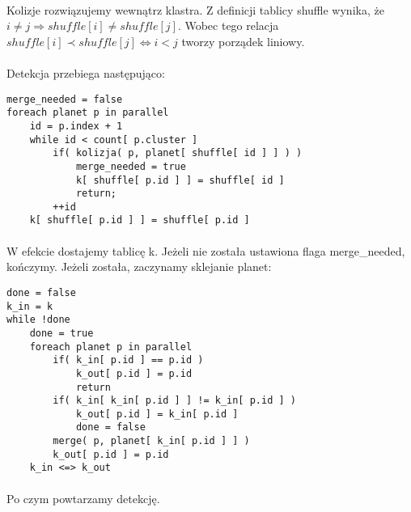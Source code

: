 \paragraph{} Kolizje rozwiązujemy wewnątrz klastra.  Z definicji tablicy shuffle wynika, że \ensuremath{i \neq j \Rightarrow shuffle[i]\neq shuffle[j]}. Wobec tego relacja \ensuremath{shuffle[i] \prec shuffle[j] \Leftrightarrow i<j } tworzy porządek liniowy.

\paragraph{} Detekcja przebiega następująco:
\begin{lstlisting}
merge_needed = false
foreach planet p in parallel
	id = p.index + 1
	while id < count[ p.cluster ]
		if( kolizja( p, planet[ shuffle[ id ] ] ) )
			merge_needed = true
			k[ shuffle[ p.id ] ] = shuffle[ id ]
			return;
		++id
	k[ shuffle[ p.id ] ] = shuffle[ p.id ]
\end{lstlisting}

\paragraph{} W efekcie dostajemy tablicę k. Jeżeli nie została ustawiona flaga merge\_needed, kończymy. Jeżeli została, zaczynamy sklejanie planet:
\begin{lstlisting}
done = false
k_in = k
while !done
	done = true
	foreach planet p in parallel	
		if( k_in[ p.id ] == p.id )
			k_out[ p.id ] = p.id
			return
		if( k_in[ k_in[ p.id ] ] != k_in[ p.id ] )
			k_out[ p.id ] = k_in[ p.id ]
			done = false
		merge( p, planet[ k_in[ p.id ] ] )
		k_out[ p.id ] = p.id
	k_in <=> k_out
\end{lstlisting}

\paragraph{} Po czym powtarzamy detekcję.
